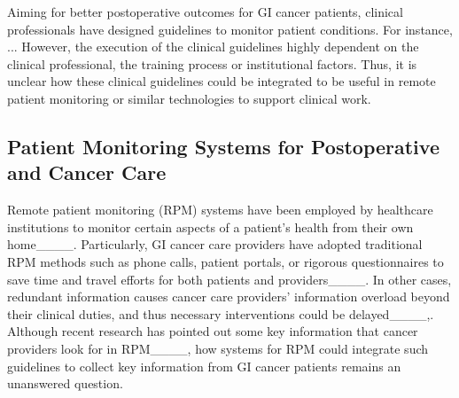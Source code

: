 Aiming for better postoperative outcomes for GI cancer patients, clinical professionals have designed guidelines to monitor patient conditions. For instance, ... 
However, the execution of the clinical guidelines highly dependent on the clinical professional, the training process or institutional factors. Thus, it is unclear how these clinical guidelines could be integrated to be useful in remote patient monitoring or similar technologies to support clinical work.

\subsection{Patient Monitoring Systems for Postoperative and Cancer Care}
\label{sub:related_work-2}
Remote patient monitoring (RPM) systems have been employed by healthcare institutions to monitor certain aspects of a patient's health from their own home____. 
Particularly, GI cancer care providers have adopted traditional RPM methods such as phone calls, patient portals, or rigorous questionnaires to save time and travel efforts for both patients and providers____.
In other cases, redundant information causes cancer care providers' information overload beyond their clinical duties, and thus necessary interventions could be delayed____,.
Although recent research has pointed out some key information that cancer providers look for in RPM____, 
how systems for RPM could integrate such guidelines to collect key information from GI cancer patients remains an unanswered question.


